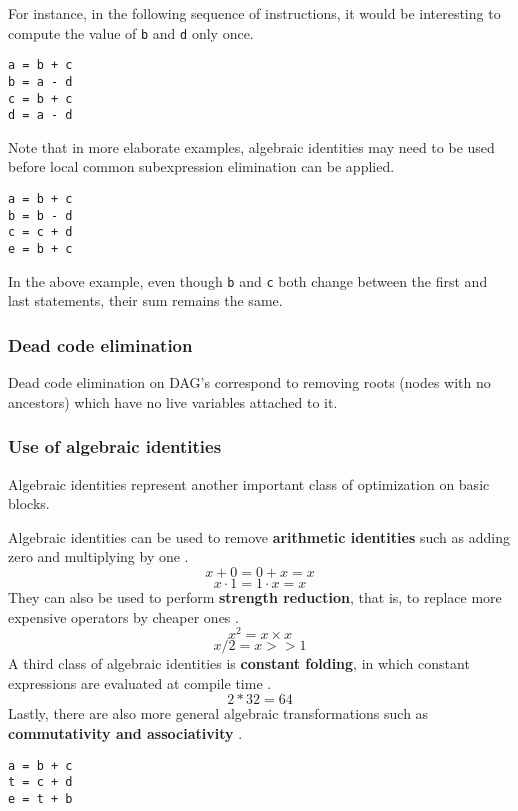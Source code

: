 For instance, in the following sequence of instructions, it would be interesting to compute the value of \texttt{b} and \texttt{d} only once.

\begin{lstlisting}
a = b + c
b = a - d
c = b + c
d = a - d
\end{lstlisting}

Note that in more elaborate examples, algebraic identities may need to be used before local common subexpression elimination can be applied.

\begin{lstlisting}
a = b + c
b = b - d
c = c + d
e = b + c
\end{lstlisting}

In the above example, even though \texttt{b} and \texttt{c} both change between the first and last statements, their sum remains the same.

\subsubsection{Dead code elimination}

Dead code elimination on DAG's correspond to removing roots (nodes with no ancestors) which have no live variables attached to it.

\subsubsection{Use of algebraic identities}

Algebraic identities represent another important class of optimization on basic blocks.

Algebraic identities can be used to remove \textbf{arithmetic identities} such as adding zero and multiplying by one \cite[p.~536]{compilers-aho-2007}.
\[x + 0 = 0 + x = x\]
\[x \cdot 1 = 1 \cdot x = x\]
They can also be used to perform \textbf{strength reduction}, that is, to replace more expensive operators by cheaper ones \cite[p.~536]{compilers-aho-2007}.
\[x^{2} = x \times x\]
\[x / 2 = x >> 1\]
A third class of algebraic identities is \textbf{constant folding}, in which constant expressions are evaluated at compile time \cite[p.~536]{compilers-aho-2007}.
\[2 * 32 = 64\]
Lastly, there are also more general algebraic transformations such as \textbf{commutativity and associativity} \cite[p.~536]{compilers-aho-2007}.

\begin{lstlisting}
a = b + c
t = c + d
e = t + b
\end{lstlisting}

